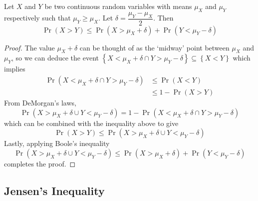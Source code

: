 \documentclass[11pt]{report} %
\begin{document}
\begin{theorem}
Let $X$ and $Y$ be two continuous random variables with means $\mu_{X}$ and $\mu_{Y}$ respectively such that $\mu_{Y} \geq \mu_{X}$. Let $\delta = \dfrac{\mu_{Y} - \mu_{X}}{2}$. Then
\begin{equation}
\operatorname{Pr}\left(X > Y\right) \leq \operatorname{Pr}\left(X > \mu_{X} + \delta\right) + \operatorname{Pr}\left(Y < \mu_{Y} - \delta\right)
\end{equation}
\end{theorem}
\begin{proof}
The value $\mu_{X} + \delta$ can be thought of as the `midway' point between $\mu_{X}$ and $\mu_{Y}$, so we can deduce the event $\left\{X < \mu_{X} + \delta \cap Y > \mu_{Y} - \delta\right\} \subseteq \left\{X <  Y\right\}$ which implies
\begin{align}
\operatorname{Pr}\left(X < \mu_{X} + \delta \cap Y > \mu_{Y} - \delta\right) &\leq \operatorname{Pr}\left(X < Y\right) \\
&\leq 1 - \operatorname{Pr}\left(X > Y\right)
\end{align}
From DeMorgan's laws,
\begin{equation}
\operatorname{Pr}\left(X > \mu_{X} + \delta \cup Y < \mu_{Y} - \delta\right) = 1 - \operatorname{Pr}\left(X < \mu_{X} + \delta \cap Y > \mu_{Y} - \delta\right)
\end{equation}
which can be combined with the inequality above to give
\begin{equation}
\operatorname{Pr}\left(X > Y\right) \leq \operatorname{Pr}\left(X > \mu_{X} + \delta \cup Y < \mu_{Y} - \delta\right)
\end{equation}
Lastly, applying Boole's inequality
\begin{equation}
\operatorname{Pr}\left(X > \mu_{X} + \delta \cup Y < \mu_{Y} - \delta\right) \leq \operatorname{Pr}\left(X > \mu_{X} + \delta\right) + \operatorname{Pr}\left(Y < \mu_{Y} - \delta\right)
\end{equation}
completes the proof.
\end{proof}

\subsection{Jensen's Inequality}
\end{document}
